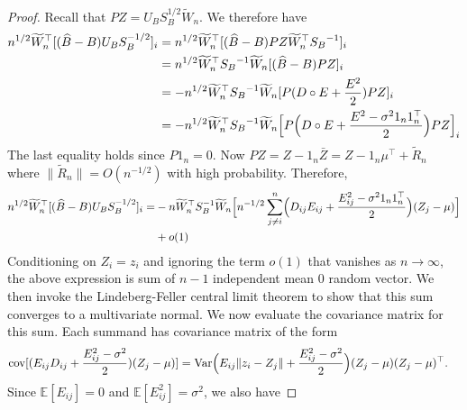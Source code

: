 \begin{proof}
 Recall that $PZ = U_B S_B^{1/2} \tilde{W}_n $. We therefore have
    \begin{align*}
        n^{1/2} \tilde{W}_n^\top [(\hat{B} - B) U_B S_B^{-1/2}]_{i}
        & = n^{1/2} \tilde{W}_n^\top [(\hat{B} - B) PZ \tilde{W}_n^\top {S_B}^{-1}]_{i} \\
        & = n^{1/2} \tilde{W}_n^\top {S_B}^{-1} \tilde{W}_n [(\hat{B} - B)PZ]_{i}\\
        & = - n^{1/2} \tilde{W}_n^\top {S_B}^{-1} \tilde{W}_n [P(D \circ E  + \frac{E^2}{2} )PZ]_{i}\\
        & = - n^{1/2} \tilde{W}_n^\top {S_B}^{-1} \tilde{W}_n \Bigl[ P \Bigl(D \circ E + \frac{E^2 - \sigma^2 1_n 1_n^{\top}}{2}\Bigr) P Z\Bigr]_{i}
    \end{align*}
The last equality holds since  $P 1_n = 0$. Now $PZ = Z - 1_n \bar{Z} = Z - 1_n \mu^{\top} + \tilde{R}_n$ where $\|\tilde{R}_n\| = O(n^{-1/2})$ with high probability.  
Therefore,
    \begin{equation*}
    \begin{split}
        n^{1/2} \tilde{W}_n^\top [(\hat{B} - B) U_B S_B^{-1/2}]_{i} 
         =& - n \tilde{W}_n^\top S_B^{-1} \tilde{W}_n \Bigl[n^{-1/2} \sum_{j \neq i}^{n} \Bigl(D_{ij} E_{ij} + \frac{E_{ij}^2 - \sigma^2 1_n 1_n^{\top}}{2} \Bigr) (Z_j - \mu)\Bigr] \\ &+ o(1) %
    \end{split}
    \end{equation*} 
Conditioning on $Z_i = z_i$ and ignoring the term $o(1)$ that vanishes as $n \rightarrow \infty$, the above expression is sum of $n-1$ independent mean $0$ random vector. We then invoke the Lindeberg-Feller central limit theorem to show that this sum converges to a multivariate normal. We now evaluate the covariance matrix for this sum. Each summand has covariance matrix of the form
\begin{align*}
\mathrm{cov}[(E_{ij} D_{ij} + \frac{E_{ij}^2 - \sigma^2}{2}) (Z_j - {\mu})]
& = \mathrm{Var}\Bigl(E_{ij} \|z_i - Z_j\| + \frac{E_{ij}^2 - \sigma^2}{2}\Bigr) (Z_j - {\mu}) (Z_j - {\mu})^\top.
\end{align*}
Since $\mathbb{E}[E_{ij}] = 0$ and $\mathbb{E}[E_{ij}^2] = \sigma^2$, we also have

\end{proof}
